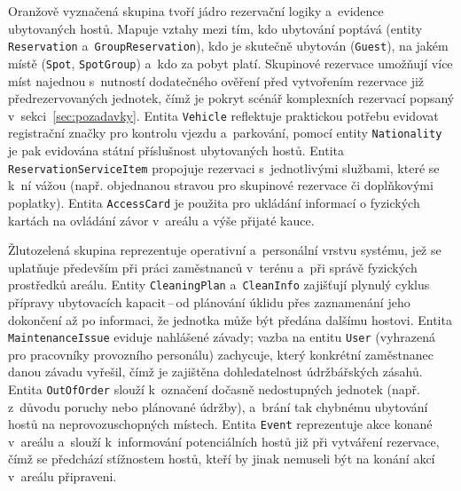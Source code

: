 Oranžově vyznačená skupina tvoří jádro rezervační logiky a~evidence ubytovaných hostů.
Mapuje vztahy mezi tím, kdo ubytování poptává (entity \texttt{Reservation} a~\texttt{GroupReservation}), kdo je skutečně ubytován (\texttt{Guest}), na jakém místě (\texttt{Spot}, \texttt{SpotGroup}) a~kdo za pobyt platí.
Skupinové rezervace umožňují  více míst najednou s~nutností dodatečného ověření před vytvořením rezervace již předrezervovaných jednotek, čímž je pokryt scénář komplexních rezervací popsaný v~sekci~\ref{sec:pozadavky}.
Entita \texttt{Vehicle} reflektuje praktickou potřebu evidovat registrační značky pro kontrolu vjezdu a~parkování, pomocí entity \texttt{Nationality} je pak evidována státní příslušnost ubytovaných hostů.
Entita \texttt{ReservationServiceItem} propojuje rezervaci s~jednotlivými službami, které se k~ní vážou (např. objednanou stravou pro skupinové rezervace či doplňkovými poplatky).
Entita \texttt{AccessCard} je použita pro ukládání informací o fyzických kartách na ovládání závor v~areálu a výše přijaté kauce.

Žlutozelená skupina reprezentuje operativní a~personální vrstvu systému, jež se uplatňuje především při práci zaměstnanců v~terénu a~při správě fyzických prostředků areálu.
Entity \texttt{CleaningPlan} a~\texttt{CleanInfo} zajišťují plynulý cyklus přípravy ubytovacích kapacit\,--\,od plánování úklidu přes zaznamenání jeho dokončení až po informaci, že jednotka může být předána dalšímu hostovi.
Entita \texttt{MaintenanceIssue} eviduje nahlášené závady; vazba na entitu \texttt{User} (vyhrazená pro pracovníky provozního personálu) zachycuje, který konkrétní zaměstnanec danou závadu vyřešil, čímž je zajištěna dohledatelnost údržbářských zásahů.
Entita \texttt{OutOfOrder} slouží k~označení dočasně nedostupných jednotek (např. z~důvodu poruchy nebo plánované údržby), a~brání tak chybnému ubytování hostů na neprovozuschopných místech.
Entita \texttt{Event} reprezentuje akce konané v~areálu a~slouží k~informování potenciálních hostů již při vytváření rezervace, čímž se předchází stížnostem hostů, kteří by jinak nemuseli být na konání akcí v~areálu připraveni.

